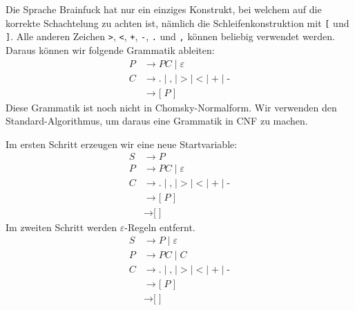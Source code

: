 \begin{loesung}
Die Sprache Brainfuck hat nur ein einziges Konstrukt, bei welchem
auf die korrekte Schachtelung zu achten ist, nämlich die
Schleifenkonstruktion mit \texttt{[} und \texttt{]}.
Alle anderen Zeichen
\texttt{>},
\texttt{<},
\texttt{+},
\texttt{-},
\texttt{.}
und
\texttt{,}
können beliebig verwendet werden.
Daraus können wir folgende Grammatik ableiten:
\begin{align*}
P&\rightarrow P C\mid \varepsilon
\\
C&\rightarrow
\texttt{.} \mid 
\texttt{,} \mid 
\texttt{>} \mid 
\texttt{<} \mid 
\texttt{+} \mid 
\texttt{-}
\\
&\rightarrow \texttt{[} \; P \; \texttt{]}
\end{align*}
Diese Grammatik ist noch nicht in Chomsky-Normalform.
Wir verwenden den Standard-Algorithmus, um daraus eine Grammatik in CNF
zu machen.

Im ersten Schritt erzeugen wir eine neue Startvariable:
\begin{align*}
S&\rightarrow P\\
P&\rightarrow P C\mid \varepsilon
\\
C&\rightarrow
\texttt{.} \mid 
\texttt{,} \mid 
\texttt{>} \mid 
\texttt{<} \mid 
\texttt{+} \mid 
\texttt{-}
\\
&\rightarrow \texttt{[} \; P \; \texttt{]}
\\
&\rightarrow \texttt{[} \; \texttt{]}
\end{align*}
Im zweiten Schritt werden $\varepsilon$-Regeln entfernt.
\begin{align*}
S&\rightarrow P
\mid \varepsilon
\\
P&\rightarrow P C \mid  C
\\
C&\rightarrow
\texttt{.} \mid 
\texttt{,} \mid 
\texttt{>} \mid 
\texttt{<} \mid 
\texttt{+} \mid 
\texttt{-}
\\
&\rightarrow \texttt{[} \; P \; \texttt{]}
\\
&\rightarrow \texttt{[} \; \texttt{]}
\end{align*}


\end{loesung}
